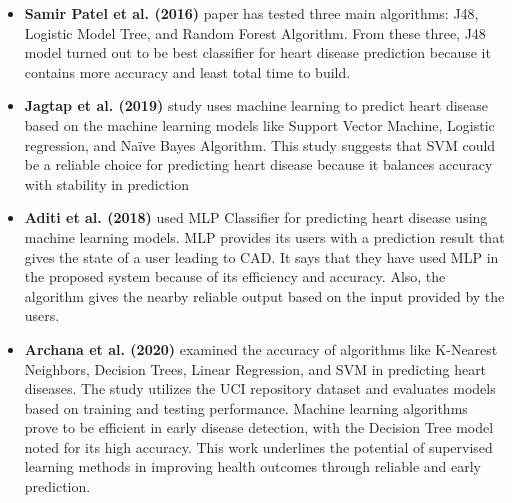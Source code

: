 \documentclass[12pt]{article}
\begin{document}
\begin{itemize}
\item \textbf{Samir Patel et al. (2016)} paper has tested three main algorithms: J48, Logistic Model Tree, and Random Forest Algorithm. From these three, J48 model turned out to be best classifier for heart disease prediction because it contains more accuracy and least total time to build.

\item \textbf{Jagtap et al. (2019)} study uses machine learning to predict heart disease based on the machine learning models like Support Vector Machine, Logistic regression, and Naïve Bayes Algorithm. This study suggests that SVM could be a reliable choice for predicting heart disease because it balances accuracy with stability in prediction


\item \textbf{Aditi et al. (2018)} used MLP Classifier for predicting heart disease using machine learning models. MLP provides its users with a prediction result that gives the state of a user leading to CAD. It says that they have used MLP in the proposed system because of its efficiency and accuracy. Also, the algorithm gives the nearby reliable output based on the input provided by the users.


\item \textbf{Archana et al. (2020)} examined the accuracy of algorithms like K-Nearest Neighbors, Decision Trees, Linear Regression, and SVM in predicting heart diseases. The study utilizes the UCI repository dataset and evaluates models based on training and testing performance. Machine learning algorithms prove to be efficient in early disease detection, with the Decision Tree model noted for its high accuracy. This work underlines the potential of supervised learning methods in improving health outcomes through reliable and early prediction.

\end{itemize}
\end{document}
